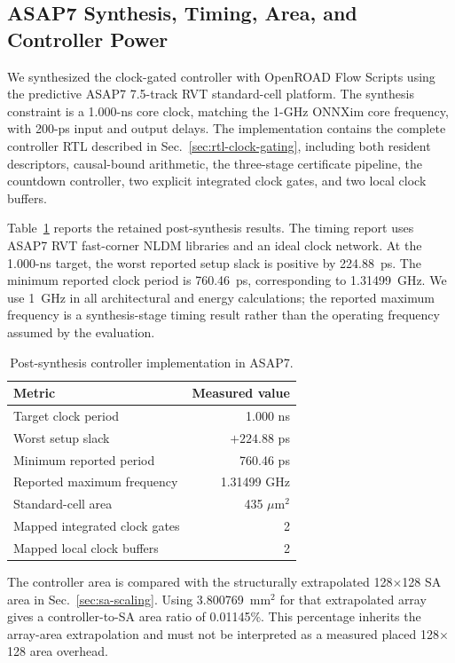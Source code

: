 \subsection{ASAP7 Synthesis, Timing, Area, and Controller Power}
\label{sec:asap7-controller-characterization}

We synthesized the clock-gated controller with OpenROAD Flow Scripts using
the predictive ASAP7 7.5-track RVT standard-cell platform.  The synthesis
constraint is a 1.000-ns core clock, matching the 1-GHz ONNXim core frequency,
with 200-ps input and output delays.  The implementation contains the complete
controller RTL described in Sec.~\ref{sec:rtl-clock-gating}, including both
resident descriptors, causal-bound arithmetic, the three-stage certificate
pipeline, the countdown controller, two explicit integrated clock gates, and
two local clock buffers.

Table~\ref{tab:controller-physical-summary} reports the retained
post-synthesis results.  The timing report uses ASAP7 RVT fast-corner NLDM
libraries and an ideal clock network.  At the 1.000-ns target, the worst
reported setup slack is positive by 224.88~ps.  The minimum reported clock
period is 760.46~ps, corresponding to 1.31499~GHz.  We use 1~GHz in all
architectural and energy calculations; the reported maximum frequency is a
synthesis-stage timing result rather than the operating frequency assumed by
the evaluation.

\begin{table}[t]
  \centering
  \caption{Post-synthesis controller implementation in ASAP7.}
  \label{tab:controller-physical-summary}
  \begin{tabular}{lr}
    \toprule
    Metric & Measured value \\
    \midrule
    Target clock period & 1.000 ns \\
    Worst setup slack & $+224.88$ ps \\
    Minimum reported period & 760.46 ps \\
    Reported maximum frequency & 1.31499 GHz \\
    Standard-cell area & 435 $\mu\mathrm{m}^{2}$ \\
    Mapped integrated clock gates & 2 \\
    Mapped local clock buffers & 2 \\
    \bottomrule
  \end{tabular}
\end{table}

The controller area is compared with the structurally extrapolated
128$\times$128 SA area in Sec.~\ref{sec:sa-scaling}.  Using
3.800769~mm$^{2}$ for that extrapolated array gives a controller-to-SA area
ratio of 0.01145\%.  This percentage inherits the array-area extrapolation and
must not be interpreted as a measured placed 128$\times$128 area overhead.

